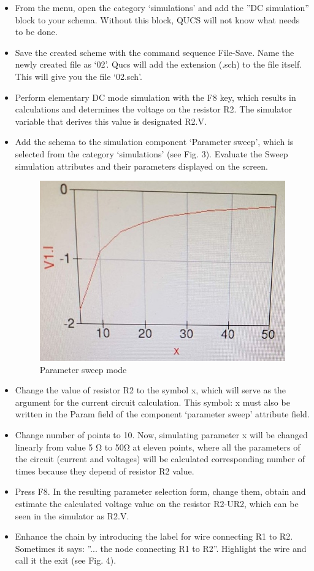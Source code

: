 \documentclass{report}
\begin{document}
\begin{itemize}
\item From the menu, open the category ‘simulations’ and add the ”DC simulation” block to
your schema. Without this block, QUCS will not know what needs to be done.
\item Save the created scheme with the command sequence File-Save. Name the newly created
file as ‘02’. Qucs will add the extension (.sch) to the file itself. This will give you the
file ‘02.sch’.

\item Perform elementary DC mode simulation with the F8 key, which results in calculations
and determines the voltage on the resistor R2. The simulator variable that derives this
value is designated R2.V.
\item Add the schema to the simulation component ‘Parameter sweep’, which is selected from
the category ‘simulations’ (see Fig. 3). Evaluate the Sweep simulation attributes and
their parameters displayed on the screen. \cite{firstRef,thirdRef}


\begin{figure}[t]
\includegraphics{Figures/figure_3_.jpg}
\caption{Parameter sweep mode}
\label{fig:figure3}
\end{figure}


\item Change the value of resistor R2 to the symbol x, which will serve as the argument for the
current circuit calculation. This symbol: x must also be written in the Param field of the
component ‘parameter sweep’ attribute field.
\item Change number of points to 10. Now, simulating parameter x will be changed linearly
from value 5 Ω to 50Ω at eleven points, where all the parameters of the circuit (current
and voltages) will be calculated corresponding number of times because they depend of
resistor R2 value.
\item Press F8. In the resulting parameter selection form, change them, obtain and estimate
the calculated voltage value on the resistor R2-UR2, which can be seen in the simulator
as R2.V.
\item Enhance the chain by introducing the label for wire connecting R1 to R2. Sometimes it
says: ”... the node connecting R1 to R2”. Highlight the wire and call it the exit (see Fig. 4). \cite{firstRef}


\end{itemize}
\end{document}
